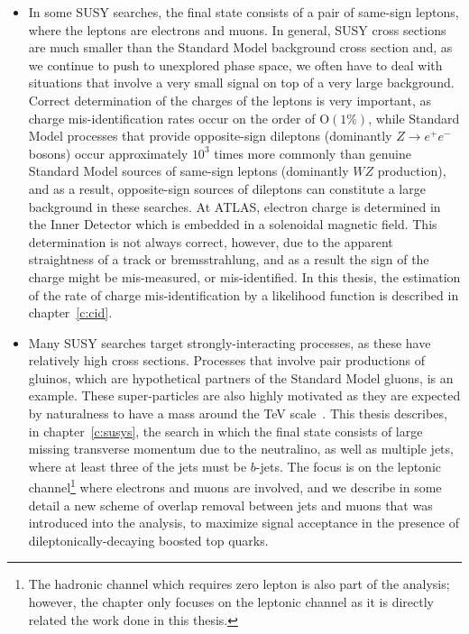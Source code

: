 \begin{itemize}[label=]

	\item In some SUSY searches, the final state consists of a pair of same-sign
	      leptons, where the leptons are electrons and muons. In general, SUSY cross
	      sections are much smaller than the Standard Model background cross section and,
	      as we continue to push to unexplored phase space, we often have to deal with
	      situations that involve a very small signal on top of a very large background.
	      Correct determination of the charges of the leptons is very important, as
	      charge mis-identification rates occur on the order of $\text{O}(1\%)$, while
	      Standard Model processes that provide opposite-sign dileptons (dominantly $Z\to
		      e^+e^-$ bosons) occur approximately $10^3$ times more commonly than genuine
	      Standard Model sources of same-sign leptons (dominantly $WZ$ production), and
	      as a result, opposite-sign sources of dileptons can constitute a large
	      background in these searches. At ATLAS, electron charge is determined in the
	      Inner Detector which is embedded in a solenoidal magnetic field. This
	      determination is not always correct, however, due to the apparent straightness
	      of a track or bremsstrahlung, and as a result the sign of the charge might be
	      mis-measured, or mis-identified. In this thesis, the estimation of the rate of
	      charge mis-identification by a likelihood function is described in
	      chapter~\ref{c:cid}.

	\item Many SUSY searches target strongly-interacting processes, as these have
	      relatively high cross sections. Processes that involve pair productions of
	      gluinos, which are hypothetical partners of the Standard Model gluons, is an
	      example. These super-particles are also highly motivated as they are expected
	      by naturalness to have a mass around the TeV scale~\cite{Barbieri:1987fn}. This
	      thesis describes, in chapter~\ref{c:susys}, the search in which the final state
	      consists of large missing transverse momentum due to the neutralino, as well as
	      multiple jets, where at least three of the jets must be $b$-jets. The focus is
	      on the leptonic channel\footnote{The hadronic channel which requires zero
		      lepton is also part of the analysis; however, the chapter only focuses on the
		      leptonic channel as it is directly related the work done in this thesis.} where
	      electrons and muons are involved, and we describe in some detail a new scheme
	      of overlap removal between jets and muons that was introduced into the
	      analysis, to maximize signal acceptance in the presence of
	      dileptonically-decaying boosted top quarks.


\end{itemize}
